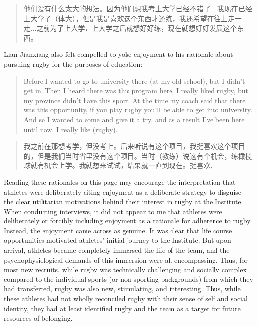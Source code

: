 \begin{CJK}{UTF8}{gbsn}
    \begin{quote}
      他们没有什么太大的想法。因为他们想我考上大学已经不错了！我现在已经上大学了（体大），但是我是喜欢这个东西才还练，我还希望在往上走一走...之前为了上大学，上大学之后就想好好练，现在就想好好发展这个东西。
    \end{quote}

Lian Jianxiang also felt compelled to yoke enjoyment to his rationale about pursuing rugby for the purposes of education:

    \begin{quote}
        Before I wanted to go to university there (at my old school), but I didn't get in.  Then I heard there was this program here, I really liked rugby, but my province didn't have this sport. At the time my coach said that there was this opportunity, if you play rugby you'll be able to get into university.  And so I wanted to come and give it a try, and as a result I've been here until now.  I really like (rugby).
    \end{quote}

    \begin{quote}
        我之前在那想考学，但没考上。后来听说有这个项目，我挺喜欢这个项目的，但是我们当时省里没有这个项目。当时（教练）说这有个机会，练橄榄球就有机会上学。我就想来试试，结果就一直到现在。挺喜欢.
    \end{quote}

Reading these rationales on this page may encourage the interpretation that athletes were deliberately citing enjoyment as a deliberate strategy to disguise the clear utilitarian motivations behind their interest in rugby at the Institute.  When conducting interviews, it did not appear to me that athletes were deliberately or forcibly including enjoyment as a rationale for adherence to rugby.  Instead, the enjoyment came across as genuine.  It was clear that life course opportunities motivated athletes' initial journey to the Institute.  But upon arrival, athletes became completely immersed the life of the team, and the psychophysiological demands of this immersion were all encompassing.  Thus, for most new recruits, while rugby was technically challenging and socially complex compared to the individual sports (or non-sporting backgrounds) from which they had transferred, rugby was also new, stimulating, and interesting.  Thus, while these athletes had not wholly reconciled rugby with their sense of self and social identity, they had at least identified rugby and the team as a target for future resources of belonging.




\end{CJK}
